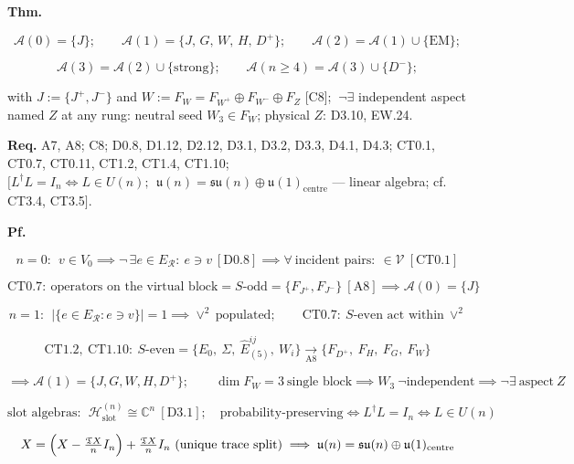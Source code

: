 \begin{theorem}\label{tag:CT0-13}
\textbf{Thm.}

\[
\mathcal A(0)=\{J\};\qquad
\mathcal A(1)=\{J,\,G,\,W,\,H,\,D^+\};\qquad
\mathcal A(2)=\mathcal A(1)\cup\{\mathrm{EM}\};
\]

\[
\mathcal A(3)=\mathcal A(2)\cup\{\mathrm{strong}\};\qquad
\mathcal A(n\ge4)=\mathcal A(3)\cup\{D^-\};
\]

with $J:=\{J^+,J^-\}$ and $W:=F_W=F_{W^+}\oplus F_{W^-}\oplus F_Z$ [C8]; $\ \neg\exists$ independent aspect named $Z$ at any rung: neutral seed $W_3\in F_W$; physical $Z$: D3.10, EW.24.

\textbf{Req.} A7, A8; C8; D0.8, D1.12, D2.12, D3.1, D3.2, D3.3, D4.1, D4.3; CT0.1, CT0.7, CT0.11, CT1.2, CT1.4, CT1.10; $\bigl[L^\dagger L=I_n\iff L\in U(n);\ \ \mathfrak u(n)=\mathfrak{su}(n)\oplus\mathfrak u(1)_{\mathrm{centre}}$ — linear algebra; cf. CT3.4, CT3.5$\bigr]$.

\textbf{Pf.}

\[
n=0:\ \ v\in V_0\implies\neg\,\exists e\in E_{\mathcal R}:\ e\ni v\ [\mathrm{D0.8}]\implies\forall\ \text{incident pairs}:\ \in\mathcal V\ [\mathrm{CT0.1}]
\]

\[
\mathrm{CT0.7}:\ \text{operators on the virtual block}=S\text{-odd}=\{F_{J^+},F_{J^-}\}\ [\mathrm{A8}]\implies\mathcal A(0)=\{J\}
\]

\[
n=1:\ \ \bigl|\{e\in E_{\mathcal R}:e\ni v\}\bigr|=1\implies\vee^2\ \text{populated};\qquad
\mathrm{CT0.7}:\ S\text{-even act within}\ \vee^2
\]

\[
\mathrm{CT1.2},\ \mathrm{CT1.10}:\ S\text{-even}=\{E_0,\ \Sigma,\ \hat E^{ij}_{(5)},\ W_i\}\xrightarrow[\mathrm{A8}]{}\{F_{D^+},\ F_H,\ F_G,\ F_W\}
\]

\[
\implies\mathcal A(1)=\{J,G,W,H,D^+\};\qquad
\dim F_W=3\ \text{single block}\implies W_3\ \neg\text{independent}\implies\neg\exists\ \text{aspect}\ Z
\]

\[
\text{slot algebras}:\ \ \mathcal H^{(n)}_{\mathrm{slot}}\cong\mathbb C^n\ [\mathrm{D3.1}];\quad
\text{probability-preserving}\iff L^\dagger L=I_n\iff L\in U(n)
\]

\[
X=\Bigl(X-\tfrac{\mathfrak T X}{n}I_n\Bigr)+\tfrac{\mathfrak T X}{n}I_n\ \text{(unique trace split)}\implies\mathfrak u(n)=\mathfrak{su}(n)\oplus\mathfrak u(1)_{\mathrm{centre}}
\]


\end{theorem}
